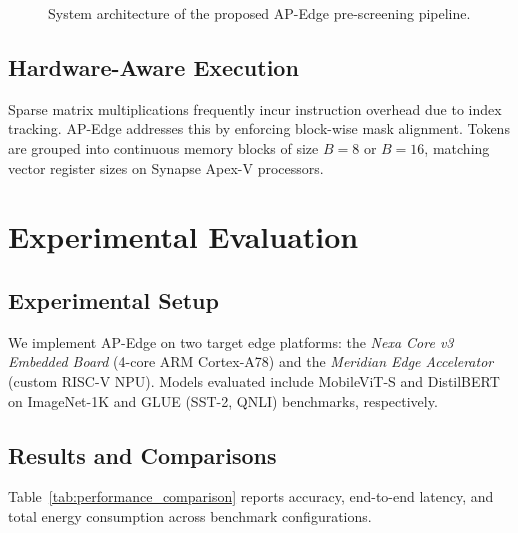 \documentclass[runningheads]{llncs}
\begin{document}
\begin{figure}[ht]
\centering
{}
\caption{System architecture of the proposed AP-Edge pre-screening pipeline.}
\label{fig:architecture}
\end{figure}

\subsection{Hardware-Aware Execution}
Sparse matrix multiplications frequently incur instruction overhead due to index tracking. AP-Edge addresses this by enforcing block-wise mask alignment. Tokens are grouped into continuous memory blocks of size $B = 8$ or $B = 16$, matching vector register sizes on Synapse Apex-V processors.

\section{Experimental Evaluation}

\subsection{Experimental Setup}
We implement AP-Edge on two target edge platforms: the \emph{Nexa Core v3 Embedded Board} (4-core ARM Cortex-A78) and the \emph{Meridian Edge Accelerator} (custom RISC-V NPU). Models evaluated include MobileViT-S and DistilBERT on ImageNet-1K and GLUE (SST-2, QNLI) benchmarks, respectively.

\subsection{Results and Comparisons}
Table~\ref{tab:performance_comparison} reports accuracy, end-to-end latency, and total energy consumption across benchmark configurations.
\end{document}
